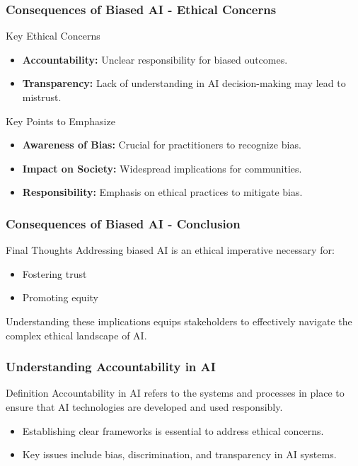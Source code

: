 \documentclass[aspectratio=169]{beamer}
\begin{document}
\begin{frame}[fragile]
    \frametitle{Consequences of Biased AI - Ethical Concerns}
    \begin{block}{Key Ethical Concerns}
        \begin{itemize}
            \item \textbf{Accountability:} Unclear responsibility for biased outcomes.
            \item \textbf{Transparency:} Lack of understanding in AI decision-making may lead to mistrust.
        \end{itemize}
    \end{block}
    
    \begin{block}{Key Points to Emphasize}
        \begin{itemize}
            \item \textbf{Awareness of Bias:} Crucial for practitioners to recognize bias.
            \item \textbf{Impact on Society:} Widespread implications for communities.
            \item \textbf{Responsibility:} Emphasis on ethical practices to mitigate bias.
        \end{itemize}
    \end{block}
\end{frame}

\begin{frame}[fragile]
    \frametitle{Consequences of Biased AI - Conclusion}
    \begin{block}{Final Thoughts}
        Addressing biased AI is an ethical imperative necessary for:
        \begin{itemize}
            \item Fostering trust
            \item Promoting equity
        \end{itemize}
        Understanding these implications equips stakeholders to effectively navigate the complex ethical landscape of AI.
    \end{block}
\end{frame}

\begin{frame}[fragile]
    \frametitle{Understanding Accountability in AI}
    \begin{block}{Definition}
        Accountability in AI refers to the systems and processes in place to ensure that AI technologies are developed and used responsibly. 
    \end{block}
    \begin{itemize}
        \item Establishing clear frameworks is essential to address ethical concerns.
        \item Key issues include bias, discrimination, and transparency in AI systems.
    \end{itemize}
\end{frame}
\end{document}
